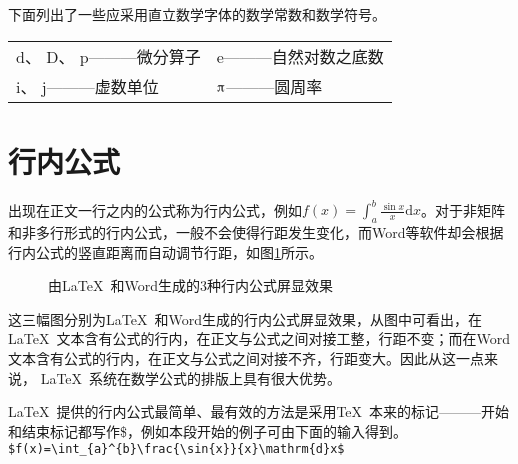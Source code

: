 \noindent 下面列出了一些应采用直立数学字体的数学常数和数学符号。

\vspace{-0.5em}
\begin{center}
	\begin{tabularx}{0.9\textwidth}{XX}
		$\mathrm{d}$、 $\mathrm{D}$、 $\mathrm{p}$———微分算子 & $\mathrm{e}$———自然对数之底数 \\
		$\mathrm{i}$、 $\mathrm{j}$———虚数单位                & $\piup$———圆周率               \\
	\end{tabularx}
\end{center}

\section{行内公式}
出现在正文一行之内的公式称为行内公式，例如$f(x)=\int_{a}^{b}\frac{\sin{x}}{x}\mathrm{d}x$。对于非矩阵和非多行形式的行内公式，一般不会使得行距发生变化，而Word等软件却会根据行内公式的竖直距离而自动调节行距，如图\ref{fig:hangju}所示。

\begin{figure}[htbp]
	\centering

	\caption{由\LaTeX~和Word生成的3种行内公式屏显效果}\label{fig:hangju}
	\vspace{-1em}
\end{figure}

这三幅图分别为\LaTeX~和Word生成的行内公式屏显效果，从图中可看出，在\LaTeX~文本含有公式的行内，在正文与公式之间对接工整，行距不变；而在Word文本含有公式的行内，在正文与公式之间对接不齐，行距变大。因此从这一点来说，
\LaTeX~系统在数学公式的排版上具有很大优势。

\LaTeX~提供的行内公式最简单、最有效的方法是采用\TeX~本来的标记———开始和结束标记都写作\$，例如本段开始的例子可由下面的输入得到。
\verb|$f(x)=\int_{a}^{b}\frac{\sin{x}}{x}\mathrm{d}x$|

